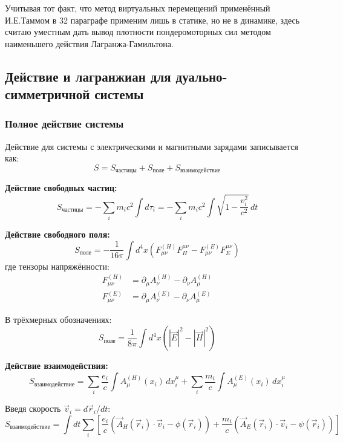 \documentclass[a4paper,10pt]{article}
\newcommand{\modblock}[1]{\colorbox{modcolor!10}{\parbox{\dimexpr\linewidth-2\fboxsep}{#1}}}
\begin{document}
\modblock{

Учитывая тот факт, что метод виртуальных перемещений применённый И.Е.Таммом в 32 параграфе применим лишь в статике, но не в динамике, здесь считаю уместным дать вывод плотности пондеромоторных сил методом наименьшего действия Лагранжа-Гамильтона.

\subsection{Действие и лагранжиан для дуально-симметричной системы}

\subsubsection{Полное действие системы}

Действие для системы с электрическими и магнитными зарядами записывается как:
\begin{equation}
S = S_{\text{частицы}} + S_{\text{поле}} + S_{\text{взаимодействие}}
\label{eq:total_action}
\end{equation}

\textbf{Действие свободных частиц:}
\begin{equation}
S_{\text{частицы}} = -\sum_i m_i c^2 \int d\tau_i = -\sum_i m_i c^2 \int \sqrt{1 - \frac{v_i^2}{c^2}} \, dt
\label{eq:action_particles}
\end{equation}

\textbf{Действие свободного поля:}
\begin{equation}
S_{\text{поле}} = -\frac{1}{16\pi} \int d^4x \left( F^{(H)}_{\mu\nu} F_H^{\mu\nu} - F^{(E)}_{\mu\nu} F_E^{\mu\nu} \right)
\label{eq:action_field}
\end{equation}
где тензоры напряжённости:
\begin{align}
F^{(H)}_{\mu\nu} &= \partial_\mu A^{(H)}_\nu - \partial_\nu A^{(H)}_\mu \\
F^{(E)}_{\mu\nu} &= \partial_\mu A^{(E)}_\nu - \partial_\nu A^{(E)}_\mu
\end{align}

В трёхмерных обозначениях:
\begin{equation}
S_{\text{поле}} = \frac{1}{8\pi} \int d^4x \left( |\vec{E}|^2 - |\vec{H}|^2 \right)
\label{eq:action_field_3d}
\end{equation}

\textbf{Действие взаимодействия:}
\begin{equation}
S_{\text{взаимодействие}} = \sum_i \frac{e_i}{c} \int A^{(H)}_\mu(x_i) \, dx^\mu_i + \sum_i \frac{m_i}{c} \int A^{(E)}_\mu(x_i) \, dx^\mu_i
\label{eq:action_interaction}
\end{equation}

Введя скорость $\vec{v}_i = d\vec{r}_i/dt$:
\begin{equation}
S_{\text{взаимодействие}} = \int dt \sum_i \left[ \frac{e_i}{c} \left( \vec{A}_H(\vec{r}_i) \cdot \vec{v}_i - \phi(\vec{r}_i) \right) + \frac{m_i}{c} \left( \vec{A}_E(\vec{r}_i) \cdot \vec{v}_i - \psi(\vec{r}_i) \right) \right]
\label{eq:action_interaction_explicit}
\end{equation}


} %
\end{document}
